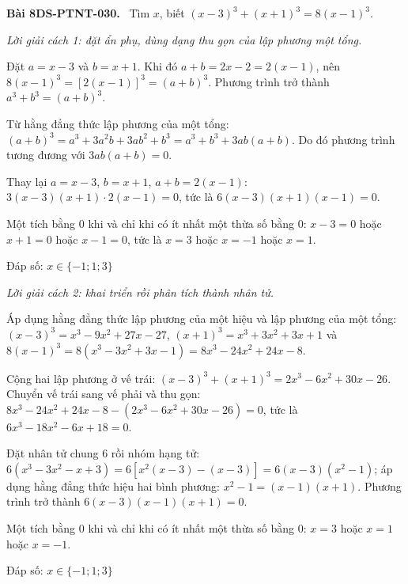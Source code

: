 \documentclass[12pt,a4paper]{article}
\newenvironment{problem}[1][]{\par\medskip\noindent\textbf{Bài #1.}\ }{\par}
\newenvironment{solution}[1][]{\par\noindent\textit{Lời giải #1.}\par}{\par}
\begin{document}
\begin{problem}[8DS-PTNT-030]
Tìm $x$, biết $(x - 3)^3 + (x + 1)^3 = 8(x - 1)^3$.

\begin{solution}[cách 1: đặt ẩn phụ, dùng dạng thu gọn của lập phương một tổng]
Đặt $a = x - 3$ và $b = x + 1$. Khi đó $a + b = 2x - 2 = 2(x - 1)$, nên $8(x - 1)^3 = \left[2(x - 1)\right]^3 = (a + b)^3$. Phương trình trở thành $a^3 + b^3 = (a + b)^3$.

Từ hằng đẳng thức lập phương của một tổng: $(a + b)^3 = a^3 + 3a^2b + 3ab^2 + b^3 = a^3 + b^3 + 3ab(a + b)$. Do đó phương trình tương đương với $3ab(a + b) = 0$.

Thay lại $a = x - 3$, $b = x + 1$, $a + b = 2(x - 1)$: $3(x - 3)(x + 1) \cdot 2(x - 1) = 0$, tức là $6(x - 3)(x + 1)(x - 1) = 0$.

Một tích bằng $0$ khi và chỉ khi có ít nhất một thừa số bằng $0$: $x - 3 = 0$ hoặc $x + 1 = 0$ hoặc $x - 1 = 0$, tức là $x = 3$ hoặc $x = -1$ hoặc $x = 1$.

Đáp số: $\boxed{x \in \{-1; 1; 3\}}$
\end{solution}

\begin{solution}[cách 2: khai triển rồi phân tích thành nhân tử]
Áp dụng hằng đẳng thức lập phương của một hiệu và lập phương của một tổng: $(x - 3)^3 = x^3 - 9x^2 + 27x - 27$, $(x + 1)^3 = x^3 + 3x^2 + 3x + 1$ và $8(x - 1)^3 = 8(x^3 - 3x^2 + 3x - 1) = 8x^3 - 24x^2 + 24x - 8$.

Cộng hai lập phương ở vế trái: $(x - 3)^3 + (x + 1)^3 = 2x^3 - 6x^2 + 30x - 26$. Chuyển vế trái sang vế phải và thu gọn: $8x^3 - 24x^2 + 24x - 8 - (2x^3 - 6x^2 + 30x - 26) = 0$, tức là $6x^3 - 18x^2 - 6x + 18 = 0$.

Đặt nhân tử chung $6$ rồi nhóm hạng tử: $6(x^3 - 3x^2 - x + 3) = 6\left[x^2(x - 3) - (x - 3)\right] = 6(x - 3)(x^2 - 1)$; áp dụng hằng đẳng thức hiệu hai bình phương: $x^2 - 1 = (x - 1)(x + 1)$. Phương trình trở thành $6(x - 3)(x - 1)(x + 1) = 0$.

Một tích bằng $0$ khi và chỉ khi có ít nhất một thừa số bằng $0$: $x = 3$ hoặc $x = 1$ hoặc $x = -1$.

Đáp số: $\boxed{x \in \{-1; 1; 3\}}$
\end{solution}
\end{problem}
\end{document}
